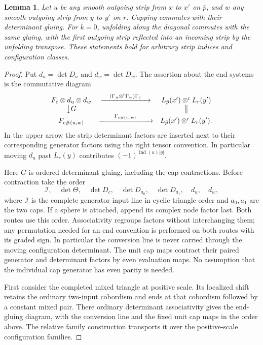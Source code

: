 \documentclass[11pt]{amsart}
\newtheorem{lemma}[theorem]{Lemma}
\theoremstyle{definition}
\theoremstyle{remark}
\theoremstyle{plain}
\numberwithin{equation}{section}
\newcommand{\ind}{\operatorname{ind}}
\begin{document}
\begin{lemma}\label{lem:fold-coherence}
Let $u$ be any smooth outgoing strip from $x$ to $x'$ on $\bar p$,
and $w$ any smooth outgoing strip from $y$ to $y'$ on $r$.
Capping commutes with their determinant gluing. For $k=0$,
unfolding along the diagonal commutes with the same gluing,
with the first outgoing strip reflected into an incoming strip
by the unfolding transpose. These
statements hold for arbitrary strip indices and configuration
classes.
\end{lemma}
\begin{proof}
Put $d_u=\det D_u$ and $d_w=\det D_w$. The assertion about the
end systems is the commutative diagram
\[
\begin{array}{ccc}
 F_c\otimes d_u\otimes d_w
 &\xrightarrow{\quad(\Gamma_u\otimes^{\mathrm r}\Gamma_w)\Gamma_c\quad}&
 L_{\bar p}(x')\otimes^{\mathrm r} L_r(y')\\
 \big\downarrow G&&\big\Vert\\
 F_{c\#(u,w)}&\xrightarrow{\qquad\Gamma_{c\#(u,w)}\qquad}&
 L_{\bar p}(x')\otimes^{\mathrm r} L_r(y').
\end{array}
\]
In the upper arrow the strip determinant factors are inserted
next to their corresponding generator factors using the right
tensor convention. In particular moving $d_u$ past $L_r(y)$
contributes $(-1)^{\ind(u)|y|}$.

Here $G$ is ordered determinant gluing, including the cap
contractions. Before contraction take the order
\[
 \mathscr I,\quad\det\Theta,\quad
 \det D_c,\quad\det D_{a_0},\quad\det D_{a_1},\quad d_u,\quad d_w,
\]
where $\mathscr I$ is the complete generator input line in cyclic
triangle order and $a_0,a_1$ are the two caps. If a sphere is
attached, append its complex node factor last. Both routes use
this order. Associativity regroups factors without interchanging
them; any permutation needed for an end convention is performed
on both routes with its graded sign. In particular the conversion
line is never carried through the moving configuration determinant.
The unit cap maps contract their paired generator and determinant
factors by even evaluation maps. No assumption that the individual
cap generator has even parity is needed.

First consider the completed mixed triangle at positive scale.
Its localized shift retains the ordinary two-input cobordism and
ends at that cobordism followed by a constant mixed pair. There
ordinary determinant associativity gives the end-gluing diagram,
with the conversion line and the fixed unit cap maps in the order
above. The relative family construction transports it over the
positive-scale configuration families.


\end{proof}
\end{document}
